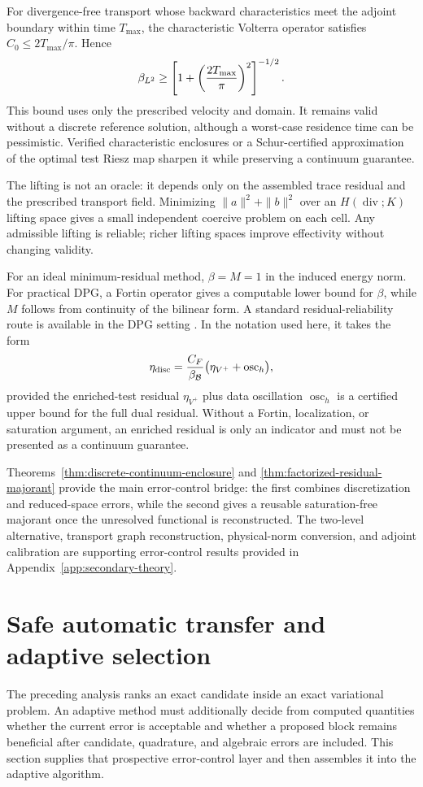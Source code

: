 \documentclass[11pt]{article}
\numberwithin{algorithm}{section}
\theoremstyle{definition}\newtheorem{definition}[theorem]{Definition}
\theoremstyle{remark}\newtheorem{remark}[theorem]{Remark}
\begin{document}
For divergence-free transport whose backward characteristics meet the
adjoint boundary within time $T_{\max}$, the characteristic Volterra operator
satisfies $C_0\leq2T_{\max}/\pi$.  Hence
\begin{equation}
 \beta_{L^2}\geq
 \left[1+\left({2T_{\max}\over\pi}\right)^2\right]^{-1/2}.
 \label{eq:transport-explicit-infsup}
\end{equation}
This bound uses only the prescribed velocity and domain.  It remains valid
without a discrete reference solution, although a worst-case residence time
can be pessimistic.  Verified characteristic enclosures or a
Schur-certified approximation of the optimal test Riesz map sharpen it while
preserving a continuum guarantee.

The lifting is not an oracle: it depends only on the assembled trace residual
and the prescribed transport field.  Minimizing $\|a\|^2+\|b\|^2$ over an
$H(\operatorname{div};K)$ lifting space gives a small independent coercive
problem on each cell.  Any admissible lifting is reliable; richer lifting
spaces improve effectivity without changing validity.

For an ideal minimum-residual method, $\beta=M=1$ in the induced energy norm.
For practical DPG, a Fortin operator gives a computable lower bound for
$\beta$, while $M$ follows from continuity of the bilinear form.  A standard
residual-reliability route is available in the DPG setting
\cite{demkowiczgopalakrishnan2011}.  In the notation used here, it takes the
form
\[
 \eta_{\rm disc}={C_F\over\beta_{\mathcal B}}
 \bigl(\eta_{V^+}+\operatorname{osc}_h\bigr),
\]
provided the enriched-test residual $\eta_{V^+}$ plus data oscillation
$\operatorname{osc}_h$ is a certified upper bound for the full dual residual.
Without a Fortin, localization, or saturation argument, an enriched residual
is only an indicator and must not be presented as a continuum guarantee.
\endsecondarytheoryC

Theorems~\ref{thm:discrete-continuum-enclosure} and
\ref{thm:factorized-residual-majorant} provide the main error-control bridge:
the first combines discretization and reduced-space errors, while the second
gives a reusable saturation-free majorant once the unresolved functional is
reconstructed.  The two-level alternative, transport graph reconstruction,
physical-norm conversion, and adjoint calibration are supporting error-control
results provided in Appendix~\ref{app:secondary-theory}.

\section{Safe automatic transfer and adaptive selection}
\label{sec:main-certificate}
The preceding analysis ranks an exact candidate inside an exact variational
problem.  An adaptive method must additionally decide from computed quantities
whether the current error is acceptable and whether a proposed block remains
beneficial after candidate, quadrature, and algebraic errors are included.
This section supplies that prospective error-control layer and then assembles
it into the adaptive algorithm.
\end{document}
